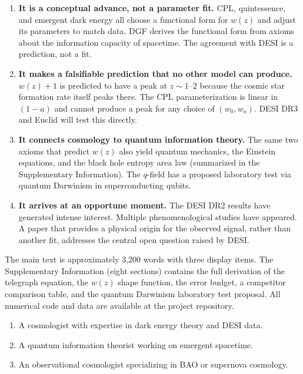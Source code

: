 \documentclass[12pt]{article}
\begin{document}
\begin{enumerate}
\item {\bf It is a conceptual advance, not a parameter fit.} CPL, quintessence, and emergent dark energy all choose a functional form for $w(z)$ and adjust its parameters to match data. DGF derives the functional form from axioms about the information capacity of spacetime. The agreement with DESI is a prediction, not a fit.

\item {\bf It makes a falsifiable prediction that no other model can produce.} $w(z)+1$ is predicted to have a peak at $z\sim1$--$2$ because the cosmic star formation rate itself peaks there. The CPL parameterization is linear in $(1-a)$ and cannot produce a peak for any choice of $(w_0,w_a)$. DESI DR3 and Euclid will test this directly.

\item {\bf It connects cosmology to quantum information theory.} The same two axioms that predict $w(z)$ also yield quantum mechanics, the Einstein equations, and the black hole entropy area law (summarized in the Supplementary Information). The $q$-field has a proposed laboratory test via quantum Darwinism in superconducting qubits.

\item {\bf It arrives at an opportune moment.} The DESI DR2 results have generated intense interest. Multiple phenomenological studies have appeared. A paper that provides a physical origin for the observed signal, rather than another fit, addresses the central open question raised by DESI.
\end{enumerate}

\vspace{8pt}


The main text is approximately 3,200 words with three display items. The Supplementary Information (eight sections) contains the full derivation of the telegraph equation, the $w(z)$ shape function, the error budget, a competitor comparison table, and the quantum Darwinism laboratory test proposal. All numerical code and data are available at the project repository.

\vspace{8pt}


\begin{enumerate}
\item A cosmologist with expertise in dark energy theory and DESI data.
\item A quantum information theorist working on emergent spacetime.
\item An observational cosmologist specializing in BAO or supernova cosmology.
\end{enumerate}
\end{document}
